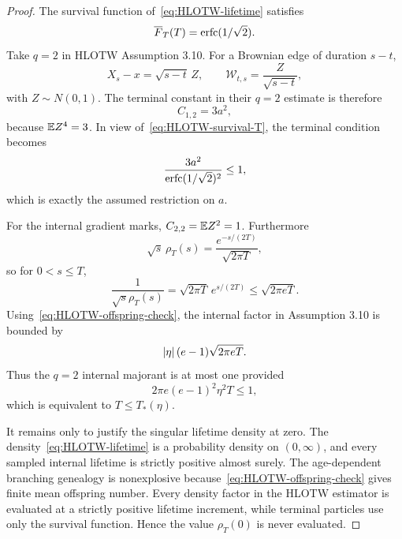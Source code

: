 \begin{proof}
The survival function of~\eqref{eq:HLOTW-lifetime} satisfies
\begin{equation}
  \overline F_T(T)
  =
  \operatorname{erfc}(1/\sqrt2).
  \label{eq:HLOTW-survival-T}
\end{equation}
Take $q=2$ in HLOTW Assumption 3.10. For a Brownian edge of duration $s-t$,
\begin{equation*}
  X_s-x=\sqrt{s-t}\,Z,
  \qquad
  \mathcal W_{t,s}=\frac Z{\sqrt{s-t}},
\end{equation*}
with $Z\sim N(0,1)$. The terminal constant in their $q=2$ estimate is therefore
\begin{equation*}
  C_{1,2}=3a^2,
\end{equation*}
because $\mathbb E Z^4=3$. In view of~\eqref{eq:HLOTW-survival-T}, the terminal condition becomes
\begin{equation*}
  \frac{3a^2}{\operatorname{erfc}(1/\sqrt2)^2}
  \leq1,
\end{equation*}
which is exactly the assumed restriction on $a$.

For the internal gradient marks, $C_{2,2}=\mathbb E Z^2=1$. Furthermore
\begin{equation*}
  \sqrt s\,\rho_T(s)
  =
  \frac{e^{-s/(2T)}}{\sqrt{2\pi T}},
\end{equation*}
so for $0<s\leq T$,
\begin{equation*}
  \frac1{\sqrt s\rho_T(s)}
  =
  \sqrt{2\pi T}\,e^{s/(2T)}
  \leq
  \sqrt{2\pi eT}.
\end{equation*}
Using~\eqref{eq:HLOTW-offspring-check}, the internal factor in Assumption 3.10 is bounded by
\begin{equation*}
  \left|\eta\right|(e-1)\sqrt{2\pi eT}.
\end{equation*}
Thus the $q=2$ internal majorant is at most one provided
\begin{equation}
  2\pi e(e-1)^2\eta^2T\leq1,
  \label{eq:HLOTW-time-condition}
\end{equation}
which is equivalent to $T\leq T_*(\eta)$.

It remains only to justify the singular lifetime density at zero. The density~\eqref{eq:HLOTW-lifetime} is a probability density on $(0,\infty)$, and every sampled internal lifetime is strictly positive almost surely. The age-dependent branching genealogy is nonexplosive because~\eqref{eq:HLOTW-offspring-check} gives finite mean offspring number. Every density factor in the HLOTW estimator is evaluated at a strictly positive lifetime increment, while terminal particles use only the survival function. Hence the value $\rho_T(0)$ is never evaluated.


\end{proof}
